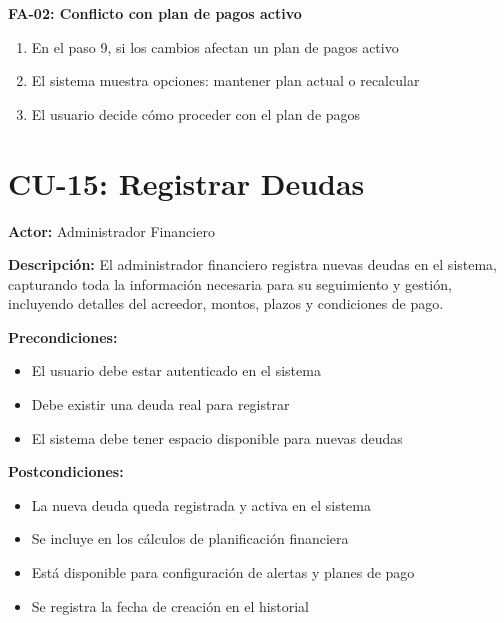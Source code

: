 \textbf{FA-02: Conflicto con plan de pagos activo}
\begin{enumerate}
    \item En el paso 9, si los cambios afectan un plan de pagos activo
    \item El sistema muestra opciones: mantener plan actual o recalcular
    \item El usuario decide cómo proceder con el plan de pagos
\end{enumerate}

\section{CU-15: Registrar Deudas}

\noindent\textbf{Actor:} Administrador Financiero

\noindent\textbf{Descripción:} El administrador financiero registra nuevas deudas en el sistema, capturando toda la información necesaria para su seguimiento y gestión, incluyendo detalles del acreedor, montos, plazos y condiciones de pago.

\noindent\textbf{Precondiciones:}
\begin{itemize}
    \item El usuario debe estar autenticado en el sistema
    \item Debe existir una deuda real para registrar
    \item El sistema debe tener espacio disponible para nuevas deudas
\end{itemize}

\noindent\textbf{Postcondiciones:}
\begin{itemize}
    \item La nueva deuda queda registrada y activa en el sistema
    \item Se incluye en los cálculos de planificación financiera
    \item Está disponible para configuración de alertas y planes de pago
    \item Se registra la fecha de creación en el historial
\end{itemize}

